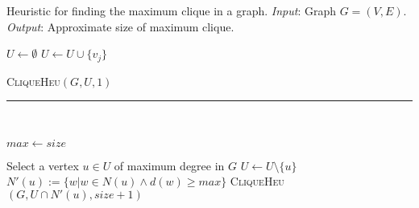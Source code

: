 \begin{algorithm}[t]
\begin{spacing}{\algospacing}
{
\small
\caption{{\protect\small Heuristic for finding the maximum clique in a graph.
{\it Input}: Graph $G = \left (V, E\right )$. {\it Output}: Approximate size of maximum clique.}}
\label{alg:mClqHeu}


\begin{algorithmic}[1]
{}
\State $U \leftarrow \emptyset$
\State $U \leftarrow U \cup \{v_j\}$ 
\EndIf
\EndFor

\State \textsc{CliqueHeu}$(G, U, 1)$
\EndIf

\EndFor
\EndProcedure
\end{algorithmic}
}
\vspace{-4pt}
\rule{1\textwidth}{.1mm}\\

{
\label{alg:clqHeu}
\begin{algorithmic}[1]

\State $max \leftarrow size$
\EndIf
{}
\EndIf


\State Select a vertex $u \in U$ of maximum degree in $G$ \label{maxDsel}
\State $U \leftarrow U \setminus \{u\} $
\State $N'(u):= \{w | w \in N(u) \wedge d(w) \ge max\}$  \label{pr4}
\State \textsc{CliqueHeu}$( G, U \cap N'(u), size + 1)$


\EndProcedure
\end{algorithmic}
}
\end{spacing}
\end{algorithm}


